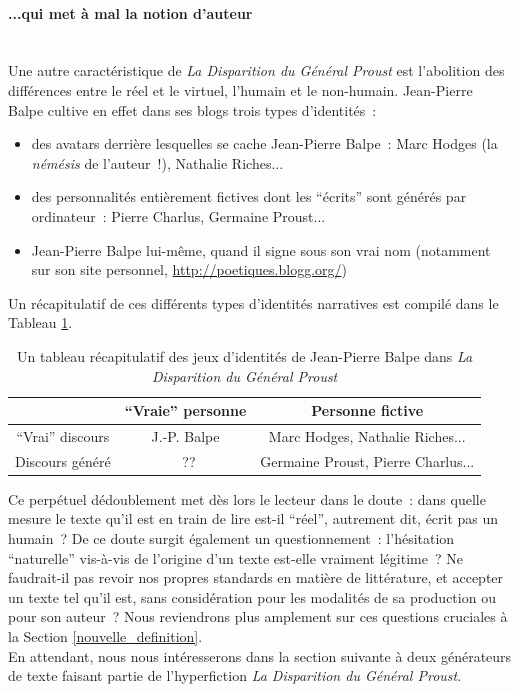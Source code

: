 \documentclass{article}
\newcommand{\subsubsubsection}[1]{\paragraph{#1}\mbox{}\\}
\begin{document}
				\subsubsubsection{...qui met à mal la notion d'auteur}
					Une autre caractéristique de \textit{La Disparition du Général Proust} est l'abolition des différences entre le réel et le virtuel, l'humain et le non-humain. Jean-Pierre Balpe cultive en effet dans ses blogs trois types d'identités~:
					\begin{itemize}
						\item des avatars derrière lesquelles se cache Jean-Pierre Balpe : Marc Hodges (la \textit{némésis} de l'auteur~!), Nathalie Riches...
						\item des personnalités entièrement fictives dont les ``écrits'' sont générés par ordinateur : Pierre Charlus, Germaine Proust...
						\item Jean-Pierre Balpe lui-même, quand il signe sous son vrai nom (notamment sur son site personnel, \href{http://poetiques.blogg.org/}{http://poetiques.blogg.org/})
					\end{itemize}
					Un récapitulatif de ces différents types d'identités narratives est compilé dans le Tableau \ref{tab:balpe_identites}.
					\begin{table}
						\centering
						\begin{tabular}{c | c c}
							&``Vraie'' personne & Personne fictive \\ \hline
							``Vrai'' discours & J.-P. Balpe & Marc Hodges, Nathalie Riches...\\
							Discours généré &~?? & Germaine Proust, Pierre Charlus...
						\end{tabular}
						\caption{Un tableau récapitulatif des jeux d'identités de Jean-Pierre Balpe dans \textit{La Disparition du Général Proust}}
						\label{tab:balpe_identites}
					\end{table}
					Ce perpétuel dédoublement met dès lors le lecteur dans le doute : dans quelle mesure le texte qu'il est en train de lire est-il ``réel'', autrement dit, écrit pas un humain ? De ce doute surgit également un questionnement : l'hésitation ``naturelle'' vis-à-vis de l'origine d'un texte est-elle vraiment légitime ? Ne faudrait-il pas revoir nos propres standards en matière de littérature, et accepter un texte tel qu'il est, sans considération pour les modalités de sa production ou pour son auteur ? Nous reviendrons plus amplement sur ces questions cruciales à la Section \ref{nouvelle_definition}.\\
					
					En attendant, nous nous intéresserons  dans la section suivante à deux générateurs de texte faisant partie de l'hyperfiction \textit{La Disparition du Général Proust}.
			
\end{document}
